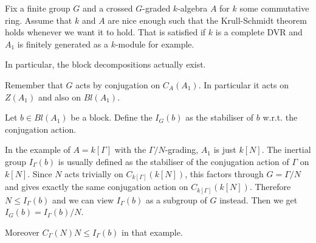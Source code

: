 
\begin{convention}
Fix a finite group $G$ and a crossed $G$-graded $k$-algebra $A$ for $k$ some commutative ring. Assume that $k$ and $A$ are nice enough such that the Krull-Schmidt theorem holds whenever we want it to hold. That is satisfied if $k$ is a complete DVR and $A_1$ is finitely generated as a $k$-module for example.

In particular, the block decompositions actually exist.
\end{convention}

\begin{remark}
Remember that $G$ acts by conjugation on $C_A(A_1)$. In particular it acts on $Z(A_1)$ and also on $Bl(A_1)$.
\end{remark}

\begin{definition}
Let $b\in Bl(A_1)$ be a block. Define the  $I_G(b)$ as the stabiliser of $b$ w.r.t. the conjugation action.
\end{definition}

\begin{remark}
In the example of $A=k[\Gamma]$ with the $\Gamma/N$-grading, $A_1$ is just $k[N]$. The inertial group $I_\Gamma(b)$ is usually defined as the stabiliser of the conjugation action of $\Gamma$ on $k[N]$. Since $N$ acts trivially on $C_{k[\Gamma]}(k[N])$, this factors through $G=\Gamma/N$ and gives exactly the same conjugation action on $C_{k[\Gamma]}(k[N])$. Therefore $N \leq I_\Gamma(b)$ and we can view $I_\Gamma(b)$ as a subgroup of $G$ instead. Then we get $I_{G}(b)=I_\Gamma(b)/N$.

\medbreak
Moreover $C_\Gamma(N)N \leq I_\Gamma(b)$ in that example.
\end{remark}
